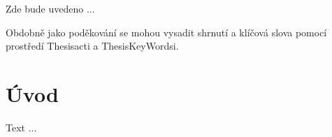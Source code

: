 \documentclass[11pt,draft,oneside]{fithesis}
\begin{document}
\FrontMatter
\ThesisTitlePage

\begin{ThesisDeclaration}
\DeclarationText
\AdvisorName
\end{ThesisDeclaration}

\begin{ThesisThanks}
Zde bude uvedeno  ... 
\end{ThesisThanks}

Obdobně jako poděkování se mohou vysadit shrnutí a klíčová 
slova pomocí prostředí Thesisacti a ThesisKeyWordsi.

\MainMatter
\tableofcontents
\chapter*{Úvod}
Text ...


\end{document}
